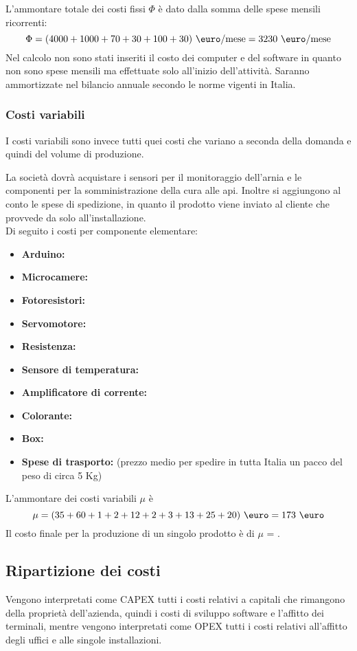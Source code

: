 L’ammontare totale dei costi fissi $\Phi$ è dato dalla somma delle spese mensili
ricorrenti:
\begin{displaymath}
\Phi = (4000 + 1000 + 70 + 30 + 100 + 30) \ \mbox{\euro/mese} = 3230 \ 
\mbox{\euro/mese}
\end{displaymath}
Nel calcolo non sono stati inseriti il costo dei computer e del software in
quanto non sono spese mensili ma effettuate solo all’inizio dell’attività.
Saranno ammortizzate nel bilancio annuale secondo le norme vigenti in Italia.
%
\subsubsection{Costi variabili}
I costi variabili sono invece tutti quei costi che variano a seconda della
domanda e quindi del volume di produzione.

La società dovrà acquistare i sensori per il monitoraggio dell’arnia e le
componenti per la somministrazione della cura alle api. Inoltre si aggiungono al
conto le spese di spedizione, in quanto il prodotto viene inviato al cliente che
provvede da solo all’installazione.\\
%
Di seguito i costi per componente elementare:
\begin{itemize}
\item \textbf{Arduino: }
\item \textbf{Microcamere: }
\item \textbf{Fotoresistori: }
\item \textbf{Servomotore: }
\item \textbf{Resistenza: }
\item \textbf{Sensore di temperatura: }
\item \textbf{Amplificatore di corrente: }
\item \textbf{Colorante: }
\item \textbf{Box: }
\item \textbf{Spese di trasporto: } (prezzo medio per spedire in tutta
Italia un pacco del peso di circa 5 Kg)
\end{itemize}
L’ammontare dei costi variabili $\mu$ è
\begin{displaymath}
\mu= (35 + 60 + 1 + 2 + 12 + 2 + 3 + 13 + 25 + 20) \ \mbox{\euro} = 173
\ \mbox{\euro}
\end{displaymath}
Il costo finale per la produzione di un singolo prodotto è di $\mu$ = .
\subsection{Ripartizione dei costi}
Vengono interpretati come CAPEX tutti i costi relativi a capitali che rimangono
della proprietà dell’azienda, quindi i costi di sviluppo software e l’affitto
dei terminali, mentre vengono interpretati come OPEX tutti i costi relativi
all’affitto degli uffici e alle singole installazioni.




